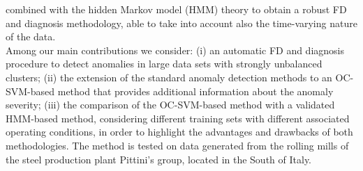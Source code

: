 combined with the hidden Markov model (HMM) theory to obtain a robust FD and diagnosis methodology, able to take into account also the time-varying nature of the data.\\
\indent Among our main contributions we consider: (i) an automatic FD and diagnosis procedure to detect anomalies in large data sets with strongly unbalanced clusters; (ii) the extension of the standard anomaly detection methods to an OC-SVM-based method that provides additional information about the anomaly severity; (iii) the comparison of the OC-SVM-based method with a validated HMM-based method, considering different training sets with different associated operating conditions, in order to highlight the advantages and drawbacks of both methodologies.
The method is tested on data  generated from the rolling mills of the steel production plant Pittini's group, located in the South of Italy.


